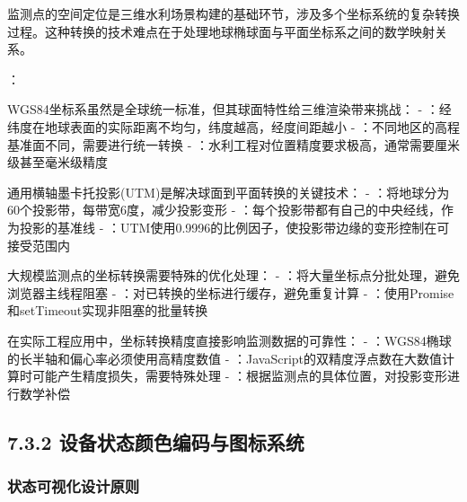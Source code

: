 
监测点的空间定位是三维水利场景构建的基础环节，涉及多个坐标系统的复杂转换过程。这种转换的技术难点在于处理地球椭球面与平面坐标系之间的数学映射关系。

：


WGS84坐标系虽然是全球统一标准，但其球面特性给三维渲染带来挑战： - ：经纬度在地球表面的实际距离不均匀，纬度越高，经度间距越小 - ：不同地区的高程基准面不同，需要进行统一转换 - ：水利工程对位置精度要求极高，通常需要厘米级甚至毫米级精度


通用横轴墨卡托投影(UTM)是解决球面到平面转换的关键技术： - ：将地球分为60个投影带，每带宽6度，减少投影变形 - ：每个投影带都有自己的中央经线，作为投影的基准线 - ：UTM使用0.9996的比例因子，使投影带边缘的变形控制在可接受范围内


大规模监测点的坐标转换需要特殊的优化处理： - ：将大量坐标点分批处理，避免浏览器主线程阻塞 - ：对已转换的坐标进行缓存，避免重复计算 - ：使用Promise和setTimeout实现非阻塞的批量转换


在实际工程应用中，坐标转换精度直接影响监测数据的可靠性： - ：WGS84椭球的长半轴和偏心率必须使用高精度数值 - ：JavaScript的双精度浮点数在大数值计算时可能产生精度损失，需要特殊处理 - ：根据监测点的具体位置，对投影变形进行数学补偿

\hypertarget{ux8bbeux5907ux72b6ux6001ux989cux8272ux7f16ux7801ux4e0eux56feux6807ux7cfbux7edf}{%
\subsection{7.3.2 设备状态颜色编码与图标系统}\label{ux8bbeux5907ux72b6ux6001ux989cux8272ux7f16ux7801ux4e0eux56feux6807ux7cfbux7edf}}

\hypertarget{ux72b6ux6001ux53efux89c6ux5316ux8bbeux8ba1ux539fux5219}{%
\subsubsection{状态可视化设计原则}\label{ux72b6ux6001ux53efux89c6ux5316ux8bbeux8ba1ux539fux5219}}

